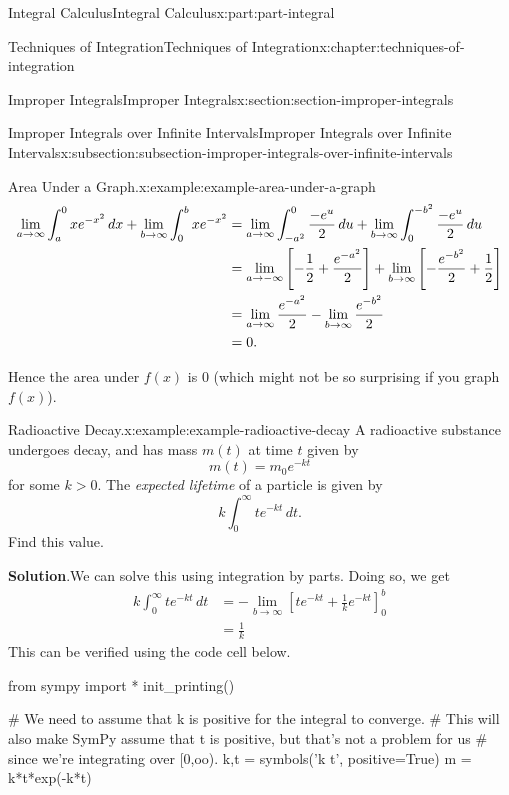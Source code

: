 \documentclass[twoside,10pt,]{tufte-book}
\newcommand{\blocktitlefont}{\relax}
\numberwithin{equation}{part}
\newcommand{\gt}{>}
\begin{document}
\begin{partptx}{Integral Calculus}{}{Integral Calculus}{}{}{x:part:part-integral}
\begin{chapterptx}{Techniques of Integration}{}{Techniques of Integration}{}{}{x:chapter:techniques-of-integration}
\begin{sectionptx}{Improper Integrals}{}{Improper Integrals}{}{}{x:section:section-improper-integrals}
\begin{subsectionptx}{Improper Integrals over Infinite Intervals}{}{Improper Integrals over Infinite Intervals}{}{}{x:subsection:subsection-improper-integrals-over-infinite-intervals}
\begin{example}{Area Under a Graph.}{x:example:example-area-under-a-graph}
\begin{align*}
\lim_{a\to\-\infty}\int_{a}^{0}xe^{-x^{2}}\,dx + \lim_{b\to\infty}\int_{0}^{b}xe^{-x^{2}} & = \lim_{a\to\-\infty}\int_{-a^{2}}^{0}\frac{-e^{u}}{2}\,du + \lim_{b\to\infty}\int_{0}^{-b^{2}}\frac{-e^{u}}{2}\,du \\
& = \lim_{a\to-\infty}\left[-\frac{1}{2} + \frac{e^{-a^{2}}}{2}\right] + \lim_{b\to\infty}\left[-\frac{e^{-b^{2}}}{2} + \frac{1}{2}\right]\\
& = \lim_{a\to\infty}\frac{e^{-a^{2}}}{2} - \lim_{b\to\infty}\frac{e^{-b^{2}}}{2} \\
& = 0. 
\end{align*}
%
\par
Hence the area under \(f(x)\) is \(0\) (which might not be so surprising if you graph \(f(x)\)).%
\end{example}
\begin{example}{Radioactive Decay.}{x:example:example-radioactive-decay}%
A radioactive substance undergoes decay, and has mass \(m(t)\) at time \(t\) given by%
\begin{equation*}
m(t) = m_{0}e^{-kt}
\end{equation*}
for some \(k\gt0\). The \emph{expected lifetime} of a particle is given by%
\begin{equation*}
k\int_{0}^{\infty}te^{-kt}\,dt.
\end{equation*}
Find this value.%
\par\smallskip%
\noindent\textbf{\blocktitlefont Solution}.\hypertarget{g:solution:idm35150998891200}{}\quad{}We can solve this using integration by parts. Doing so, we get%
\begin{align*}
k\int_{0}^{\infty}te^{-kt}\,dt & = -\lim_{b\to\infty}\left[te^{-kt} + \frac{1}{k}e^{-kt}\right]_{0}^{b} \\
& = \frac{1}{k} 
\end{align*}
This can be verified using the code cell below.%
\end{example}
\begin{sageinput}
from sympy import *
init_printing()

# We need to assume that k is positive for the integral to converge.
# This will also make SymPy assume that t is positive, but that's not a problem for us
# since we're integrating over [0,oo).
k,t = symbols('k t', positive=True)
m = k*t*exp(-k*t)


\end{sageinput}
\end{subsectionptx}
\end{sectionptx}
\end{chapterptx}
\end{partptx}
\end{document}

